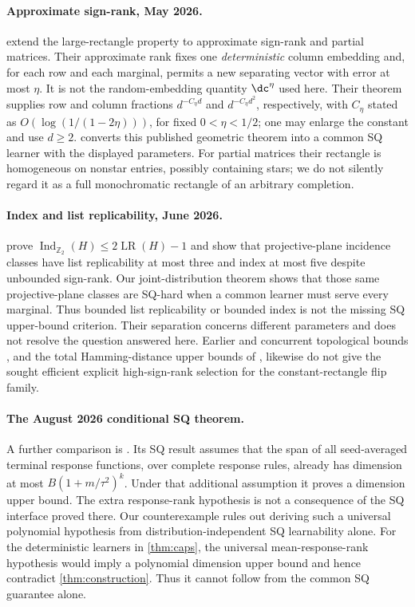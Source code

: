 \paragraph{Approximate sign-rank, May 2026.}
\citet[Theorem~1.3]{BHKR26} extend the large-rectangle property to approximate sign-rank and partial matrices. Their approximate rank fixes one \emph{deterministic} column embedding and, for each row and each marginal, permits a new separating vector with error at most $\eta$. It is not the random-embedding quantity $\dc^\eta$ used here. Their theorem supplies row and column fractions $d^{-C_\eta d}$ and $d^{-C_\eta d^2}$, respectively, with $C_\eta$ stated as $O(\log(1/(1-2\eta)))$, for fixed $0<\eta<1/2$; one may enlarge the constant and use $d\ge2$.  converts this published geometric theorem into a common SQ learner with the displayed parameters. For partial matrices their rectangle is homogeneous on nonstar entries, possibly containing stars; we do not silently regard it as a full monochromatic rectangle of an arbitrary completion.

\paragraph{Index and list replicability, June 2026.}
\citet{BHHLT26} prove $\operatorname{Ind}_{\mathbb Z_2}(H)\le2\operatorname{LR}(H)-1$ and show that projective-plane incidence classes have list replicability at most three and index at most five despite unbounded sign-rank. Our joint-distribution theorem shows that those same projective-plane classes are SQ-hard when a common learner must serve every marginal. Thus bounded list replicability or bounded index is not the missing SQ upper-bound criterion. Their separation concerns different parameters and does not resolve the question answered here. Earlier and concurrent topological bounds \citep{HHM23,FHV26}, and the total Hamming-distance upper bounds of \citet{GHIS25}, likewise do not give the sought efficient explicit high-sign-rank selection for the constant-rectangle flip family.

\paragraph{The August 2026 conditional SQ theorem.}
A further comparison is \citet[Assumption~4.42 and Theorem~4.9]{VALG26}. Its SQ result assumes that the span of all seed-averaged terminal response functions, over complete response rules, already has dimension at most $B(1+m/\tau^2)^k$. Under that additional assumption it proves a dimension upper bound. The extra response-rank hypothesis is not a consequence of the SQ interface proved there. Our counterexample rules out deriving such a universal polynomial hypothesis from distribution-independent SQ learnability alone. For the deterministic learners in \cref{thm:caps}, the universal mean-response-rank hypothesis would imply a polynomial dimension upper bound and hence contradict \cref{thm:construction}. Thus it cannot follow from the common SQ guarantee alone. 

